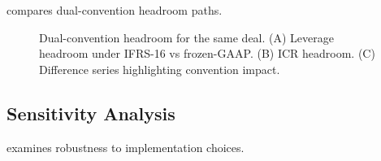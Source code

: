 \documentclass[11pt,a4paper]{article}
\numberwithin{equation}{section}
\theoremstyle{plain}
\theoremstyle{definition}
\begin{document}
 compares dual-convention headroom paths.

\begin{figure}[h]
\centering
{}
\caption{Dual-convention headroom for the same deal. (A) Leverage headroom under IFRS-16 vs frozen-GAAP. (B) ICR headroom. (C) Difference series highlighting convention impact.}
\label{fig:dual_convention}
\end{figure}

\subsection{Sensitivity Analysis}

 examines robustness to implementation choices.
\end{document}
